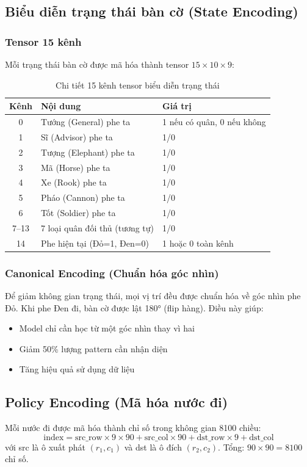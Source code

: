 \subsection{Biểu diễn trạng thái bàn cờ (State Encoding)}

\subsubsection{Tensor 15 kênh}
Mỗi trạng thái bàn cờ được mã hóa thành tensor $15 \times 10 \times 9$:

\begin{table}[H]
\centering
\caption{Chi tiết 15 kênh tensor biểu diễn trạng thái}
\begin{tabular}{cll}
\toprule
\textbf{Kênh} & \textbf{Nội dung} & \textbf{Giá trị} \\
\midrule
0 & Tướng (General) phe ta & 1 nếu có quân, 0 nếu không \\
1 & Sĩ (Advisor) phe ta & 1/0 \\
2 & Tượng (Elephant) phe ta & 1/0 \\
3 & Mã (Horse) phe ta & 1/0 \\
4 & Xe (Rook) phe ta & 1/0 \\
5 & Pháo (Cannon) phe ta & 1/0 \\
6 & Tốt (Soldier) phe ta & 1/0 \\
7--13 & 7 loại quân đối thủ (tương tự) & 1/0 \\
14 & Phe hiện tại (Đỏ=1, Đen=0) & 1 hoặc 0 toàn kênh \\
\bottomrule
\end{tabular}
\end{table}

\subsubsection{Canonical Encoding (Chuẩn hóa góc nhìn)}
Để giảm không gian trạng thái, mọi vị trí đều được chuẩn hóa về góc nhìn phe Đỏ. Khi phe Đen đi, bàn cờ được lật 180° (flip hàng). Điều này giúp:
\begin{itemize}
    \item Model chỉ cần học từ một góc nhìn thay vì hai
    \item Giảm 50\% lượng pattern cần nhận diện
    \item Tăng hiệu quả sử dụng dữ liệu
\end{itemize}

\subsection{Policy Encoding (Mã hóa nước đi)}
Mỗi nước đi được mã hóa thành chỉ số trong không gian 8100 chiều:
\begin{equation}
    \text{index} = \text{src\_row} \times 9 \times 90 + \text{src\_col} \times 90 + \text{dst\_row} \times 9 + \text{dst\_col}
\end{equation}
với src là ô xuất phát $(r_1, c_1)$ và dst là ô đích $(r_2, c_2)$. Tổng: $90 \times 90 = 8100$ chỉ số.

